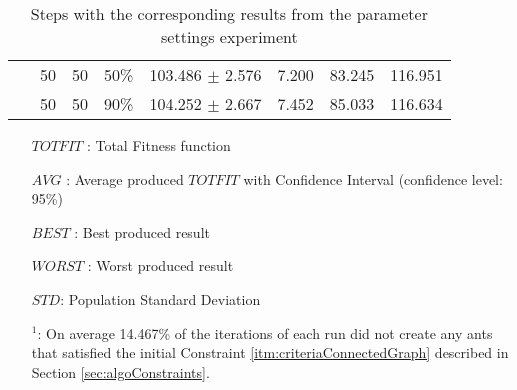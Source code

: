 \begin{table}
\begin{tabular}{|l|l|l|c||c|c|c|c|}
    ~ & 50 & 50 & 50\% & 103.486 $\pm$ 2.576 & 7.200 & 83.245 & 116.951\\
    ~ & 50 & 50 & 90\% & 104.252 $\pm$ 2.667 & 7.452 & 85.033 & 116.634\\
    \hline
    \end{tabular}
    \caption {Steps with the corresponding results from the parameter settings experiment}
    \tiny
    \begin{itemize}[noitemsep]
    \item[$TOTFIT$ :] Total Fitness function
    \item[$AVG$ :] Average produced $TOTFIT$ with Confidence Interval (confidence level: 95\%)
    \item[$BEST$ :] Best produced result
    \item[$WORST$ :] Worst produced result
    \item[$STD$:] Population Standard Deviation 
    \item[$^1$:] On average 14.467\% of the iterations of each run did not create any ants that satisfied the initial Constraint \ref{itm:criteriaConnectedGraph} described in Section \vref{sec:algoConstraints}.
    \end{itemize}
    \label{table:pm1}
\end{table}

